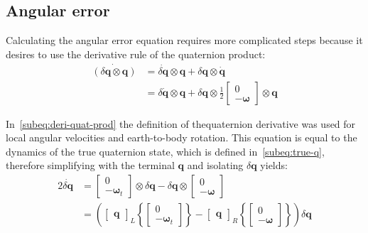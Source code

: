 \subsection{Angular error}

Calculating the angular error equation requires more complicated steps because it desires to use the derivative rule of the quaternion product:
\begin{equation}
\begin{aligned}
    \dot{(\delta\mathbf{q} \otimes \mathbf{q} )} &= \dot{\delta\mathbf{q}} \otimes \mathbf{q}+\delta\mathbf{q}\otimes\dot{\mathbf{q}} \\
    &=\delta\dot{\mathbf{q}}\otimes\mathbf{q} + \delta\mathbf{q} \otimes
    \frac{1}{2}\begin{bmatrix}
        0 \\ -\boldsymbol{\omega}
    \end{bmatrix}\otimes\mathbf{q}
\end{aligned}
\label{subeq:deri-quat-prod}
\end{equation}

In~\eqref{subeq:deri-quat-prod} the definition of thequaternion derivative was used for local angular velocities and earth-to-body rotation. This equation is equal to the dynamics of the true quaternion state, which is defined in~\eqref{subeq:true-q}, therefore simplifying with the terminal $\mathbf{q}$ and isolating $\delta\mathbf{q}$ yields:
\begin{equation}
\begin{aligned}
    2\dot{\delta\mathbf{q}}&=\begin{bmatrix} 0 \\ -\boldsymbol{\omega}_t \end{bmatrix}\otimes \delta\mathbf{q} -
    \delta\mathbf{q}\otimes \begin{bmatrix} 0 \\ -\boldsymbol{\omega} \end{bmatrix} \\ &= 
    \left(\begin{bmatrix} \mathbf{q} \end{bmatrix}_L
    \left\{\begin{bmatrix} 0 \\ -\boldsymbol{\omega}_t \end{bmatrix}\right\}-
    \begin{bmatrix} \mathbf{q} \end{bmatrix}_R
    \left\{\begin{bmatrix} 0 \\ -\boldsymbol{\omega} \end{bmatrix}\right\}\right)\delta\mathbf{q}
\end{aligned}    
\end{equation}

